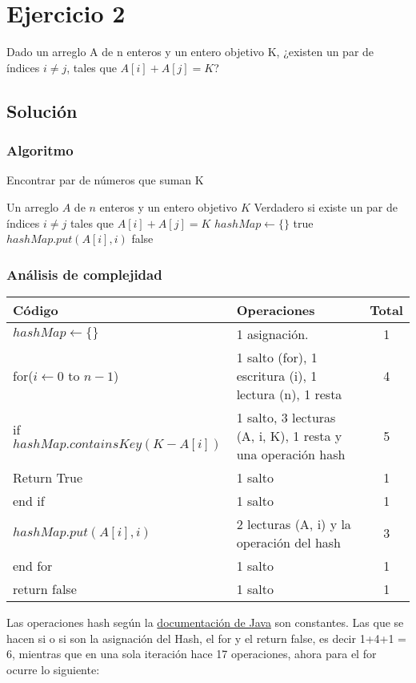 \section{Ejercicio 2}
Dado un arreglo A de n enteros y un entero objetivo K, ¿existen un par de índices $i \neq j$, tales que $A[i] + A[j] = K$?

\subsection*{Solución}
\subsubsection*{Algoritmo}
\begin{algorithm}[H]
\caption{Encontrar par de números que suman K}
\begin{algorithmic}[1]
\REQUIRE Un arreglo $A$ de $n$ enteros y un entero objetivo $K$
\ENSURE Verdadero si existe un par de índices $i \neq j$ tales que $A[i] + A[j] = K$
\STATE $hashMap \gets \{\}$
        \RETURN true
    \ENDIF
    \STATE $hashMap.put(A[i], i)$
\ENDFOR
\RETURN false
\end{algorithmic}
\end{algorithm}

\subsubsection*{Análisis de complejidad}
\begin{center}
\small
\begin{tabular}{|p{4.5cm}|p{6.5cm}|c|}
  \hline
  \textbf{Código} & \textbf{Operaciones} & \textbf{Total} \\
  \hline
 $hashMap \gets \{\}$    & 1 asignación.   & 1 \\
  \hline
  for($i \gets 0$ to $n-1$)    & 1 salto (for), 1 escritura (i), 1 lectura (n), 1 resta & 4    \\
  \hline
  if $hashMap.containsKey(K - A[i])$ & 1 salto, 3 lecturas (A, i, K), 1 resta y una operación hash& 5 \\
  \hline
  Return True & 1 salto & 1 \\
  \hline
  end if & 1 salto & 1 \\
  \hline
  $hashMap.put(A[i], i)$ & 2 lecturas (A, i) y la operación del hash & 3 \\
  \hline
  end for & 1 salto & 1 \\
  \hline
  return false & 1 salto & 1 \\
  \hline
\end{tabular}
\end{center}
Las operaciones hash según la \href{https://docs.oracle.com/javase/8/docs/api/java/util/HashMap.html}{documentación de Java} son constantes.
Las que se hacen si o si son la asignación del Hash, el for y el return false, es decir 1+4+1 = 6, mientras que en una sola iteración hace 17 operaciones, ahora para el for ocurre lo siguiente:

